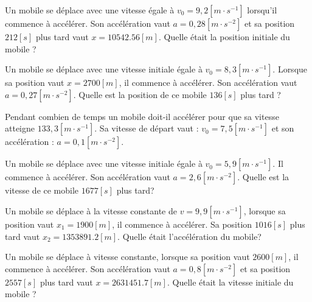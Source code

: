 \begin{exercise}
\end{exercise}

\begin{exercise}
  Un mobile se déplace avec une vitesse égale à \(v_0=9,2\unit{[m \cdot s^{-1}]}\) lorsqu'il commence à accélérer. Son accélération vaut \(a=0,28\unit{[m \cdot s^{-2}]}\) et sa position \(212\unit{[s]}\) plus tard vaut \(x=\num{10542,56}[m]\).
  Quelle était la position initiale du mobile ?
\end{exercise}


\begin{exercise}
  Un mobile se déplace avec une vitesse initiale égale à \(v_0=8,3\unit{[m \cdot s^{-1}]}\).
  Lorsque sa position vaut \(x=2700[m]\), il commence à accélérer. Son accélération vaut \(a=0,27\unit{[m \cdot s^{-2}]}\).
  Quelle est la position de ce mobile \(136\unit{[s]}\) plus tard ?
\end{exercise}



\begin{exercise}
  Pendant combien de temps un mobile doit-il accélérer pour que sa vitesse atteigne \(133,3\unit{[m \cdot s^{-1}]}\). Sa vitesse de départ vaut : \(v_0=7,5\unit{[m \cdot s^{-1}]}\) et son accélération : \(a=0,1\unit{[m \cdot s^{-2}]}\).
\end{exercise}


\begin{exercise}
  Un mobile se déplace avec une vitesse initiale égale à \(v_0=5,9\unit{[m \cdot s^{-1}]}\). Il commence à accélérer. Son accélération vaut \(a=2,6\unit{[m \cdot s^{-2}]}\).
  Quelle est la vitesse de ce mobile \(1677\unit{[s]}\) plus tard?
\end{exercise}

\begin{exercise}
  Un mobile se déplace à la vitesse constante de \(v=9,9\unit{[m \cdot s^{-1}]}\), lorsque sa position vaut \(x_1=1900[m]\), il commence à accélérer. Sa position \(1016\unit{[s]}\) plus tard vaut \(x_2=\num{1353891,2}[m]\).
  Quelle était l'accélération du mobile?
\end{exercise}

\begin{exercise}
  Un mobile se déplace à vitesse constante, lorsque sa position vaut \(2600[m]\), il commence à accélérer.
  Son accélération vaut \(a=0,8[m \cdot s^{-2}]\) et sa position \(2557\unit{[s]}\) plus tard vaut \(x=\num{2631451,7}[m]\).
  Quelle était la vitesse initiale du mobile ?
\end{exercise}

